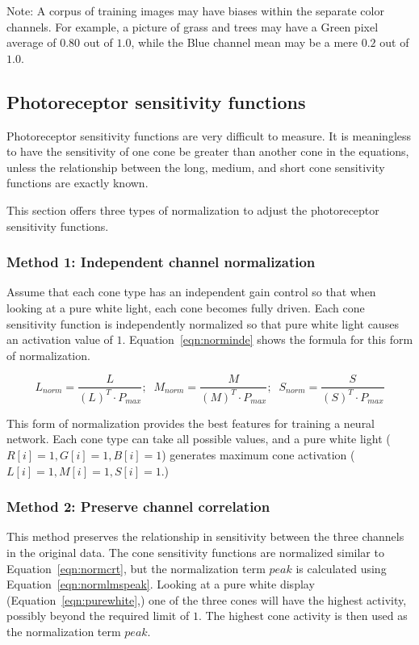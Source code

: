 \documentclass[12pt]{article}
\begin{document}
Note: A corpus of training images may have biases within the separate
color channels.  For example, a picture of grass and trees may have a
Green pixel average of $0.80$ out of $1.0$, while the Blue channel
mean may be a mere $0.2$ out of $1.0$.

\subsection{Photoreceptor sensitivity functions}

Photoreceptor sensitivity functions are very difficult to measure.  It
is meaningless to have the sensitivity of one cone be greater than
another cone in the equations, unless the relationship between the
long, medium, and short cone sensitivity functions are exactly known.

This section offers three types of normalization to adjust the
photoreceptor sensitivity functions.

\subsubsection{Method 1: Independent channel normalization}
\label{sec:independ}

Assume that each cone type has an independent gain control so that
when looking at a pure white light, each cone becomes fully driven.
Each cone sensitivity function is independently normalized so that
pure white light causes an activation value of $1$.
Equation~\ref{eqn:norminde} shows the formula for this form of
normalization.

\begin{equation}
L_{norm} = \frac{L}{(L)^T \cdot P_{max}}; \;\;
M_{norm} = \frac{M}{(M)^T \cdot P_{max}}; \;\;
S_{norm} = \frac{S}{(S)^T \cdot P_{max}}
\label{eqn:norminde}
\end{equation}

This form of normalization provides the best features for training a
neural network.  Each cone type can take all possible values, and a
pure white light ($R[i]=1,G[i]=1,B[i]=1$) generates maximum cone
activation ($L[i]=1,M[i]=1,S[i]=1$.)


\subsubsection{Method 2: Preserve channel correlation}  

This method preserves the relationship in sensitivity between the
three channels in the original data.  The cone sensitivity functions
are normalized similar to Equation~\ref{eqn:normcrt}, but the
normalization term $peak$ is calculated using
Equation~\ref{eqn:normlmspeak}.  Looking at a pure white display
(Equation~\ref{eqn:purewhite},) one of the three cones will have the
highest activity, possibly beyond the required limit of $1$.  The
highest cone activity is then used as the normalization term $peak$.
\end{document}
